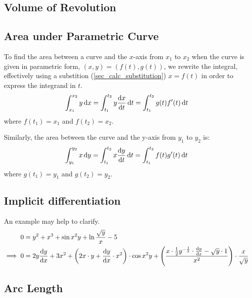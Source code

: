 \subsection{Volume of Revolution}

\subsection{Area under Parametric Curve} \label{sec_calc_parametric_area}

To find the area between a curve and the \(x\)-axis from \(x_1\) to \(x_2\)
when the curve is given in parametric form, \((x, y) = (f(t), g(t))\),
we rewrite the integral, effectively using a substition
(\ref{sec_calc_substitution}) \(x = f(t)\) in order to express the integrand
in \(t\).
\begin{equation}
\int_{x_1}^{x_2} y \dd{x} =
 \int_{t_1}^{t_2} y \dv{x}{t} \dd{t} =
 \int_{t_1}^{t_2} g(t)f'(t) \dd{t}
\end{equation}
where \(f(t_1) = x_1\) and \(f(t_2) = x_2\).

Similarly, the area between the curve and the y-axis from \(y_1\) to \(y_2\)
is:
\begin{equation}
\int_{y_1}^{y_2} x \dd{y} =
 \int_{t_1}^{t_2} x \dv{y}{t} \dd{t} =
 \int_{t_1}^{t_2} f(t)g'(t) \dd{t}
\end{equation}
where \(g(t_1) = y_1\) and \(g(t_2) = y_2\).

\subsection{Implicit differentiation}



An example may help to clarify.
\begin{align*}
0 &= y^2 + x^3 + \sin x^2 y + \ln \frac{\sqrt y} x - 5 \\
\implies 0 &=
            2y \dv{y}{x} + 3x^2 +
            \pqty{2x \cdot y + \dv{y}{x} \cdot x^2} \cdot \cos x^2 y +
            \pqty{\frac{x \cdot \frac 12 y^{-\frac 12} \cdot \dv{y}{x} -
                        \sqrt y \cdot 1}
                       {x^2}} \cdot \frac{x}{\sqrt y} \\
\end{align*}


\subsection{Arc Length}

